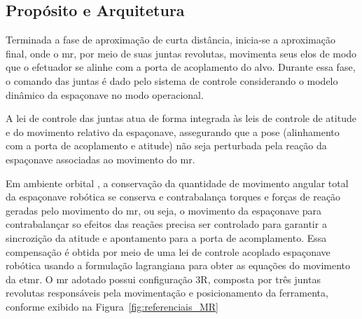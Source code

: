 \subsection{Propósito e Arquitetura}
\label{sec:proposito_arquitetura}

Terminada a fase de aproximação de curta distância, inicia-se a aproximação final, onde o \gls{mr}, por meio de suas juntas revolutas, movimenta seus elos de modo que o efetuador se alinhe com a porta de acoplamento do alvo.
Durante essa fase, o comando das juntas é dado pelo sistema de controle considerando o modelo dinâmico da espaçonave no modo operacional.

A lei de controle das juntas atua de forma integrada às leis de controle de atitude e do movimento relativo da espaçonave, assegurando que a pose (alinhamento com a porta de acoplamento e atitude) não seja perturbada pela reação da espaçonave associadas ao movimento do \gls{mr}.

Em ambiente orbital , a conservação da quantidade de movimento angular total da espaçonave robótica se conserva e contrabalança torques e forças de reação geradas pelo movimento do \gls{mr}, ou seja, o movimento da espaçonave para contrabalançar so efeitos das reaçães precisa ser controlado para garantir a sincrozição da atitude e apontamento para a porta de acomplamento.
Essa compensação é obtida por meio de uma lei de controle acoplado espaçonave robótica usando a formulação lagrangiana para obter as equações do movimento da \gls{etmr}.
O \gls{mr} adotado possui configuração 3R, composta por três juntas revolutas responsáveis pela movimentação e posicionamento da ferramenta, conforme exibido na Figura~\ref{fig:referenciais_MR}
